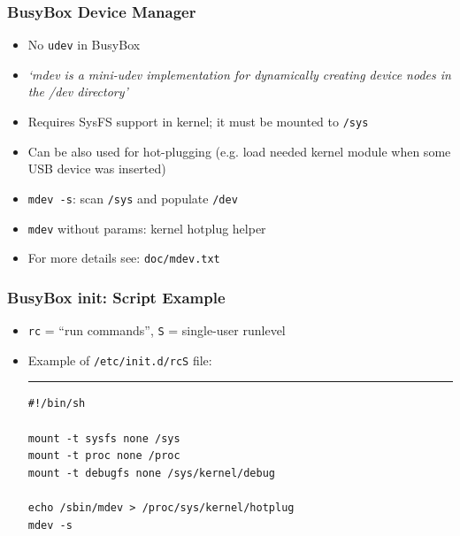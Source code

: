 \documentclass[aspectratio=169]{beamer}
\begin{document}
\begin{frame}
  \frametitle{BusyBox Device Manager}
  \begin{itemize}
    \item No \texttt{udev} in BusyBox
    \item \textit{`mdev is a mini-udev implementation for dynamically creating
                  device nodes in the /dev directory'}
    \item Requires SysFS support in kernel; it must be mounted to \texttt{/sys}
    \item Can be also used for hot-plugging (e.g. load needed kernel module when
          some USB device was inserted)
    \item \texttt{mdev -s}: scan \texttt{/sys} and populate \texttt{/dev}
    \item \texttt{mdev} without params: kernel hotplug helper
    \item For more details see: \texttt{doc/mdev.txt}
  \end{itemize}
\end{frame}

\begin{frame}[fragile]
  \frametitle{BusyBox init: Script Example}
  \begin{itemize}
    \item \texttt{rc} = ``run commands'', \texttt{S} = single-user runlevel
    \item Example of \texttt{/etc/init.d/rcS} file:
    \vspace{3mm}
    \hrule
    \vspace{3mm}
    \begin{verbatim}
#!/bin/sh

mount -t sysfs none /sys
mount -t proc none /proc
mount -t debugfs none /sys/kernel/debug

echo /sbin/mdev > /proc/sys/kernel/hotplug
mdev -s
    \end{verbatim}
  \end{itemize}
\end{frame}
\end{document}
